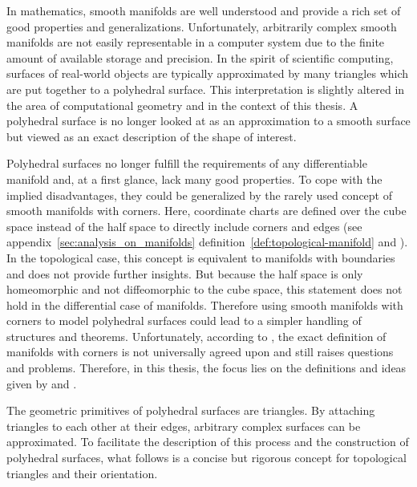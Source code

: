 \documentclass{stdlocal}
\begin{document}
  In mathematics, smooth manifolds are well understood and provide a rich set of good properties and generalizations.
  Unfortunately, arbitrarily complex smooth manifolds are not easily representable in a computer system due to the finite amount of available storage and precision.
  In the spirit of scientific computing, surfaces of real-world objects are typically approximated by many triangles which are put together to a polyhedral surface.
  This interpretation is slightly altered in the area of computational geometry and in the context of this thesis.
  A polyhedral surface is no longer looked at as an approximation to a smooth surface but viewed as an exact description of the shape of interest.
  \autocite{sharp2020}

  Polyhedral surfaces no longer fulfill the requirements of any differentiable manifold and, at a first glance, lack many good properties.
  To cope with the implied disadvantages, they could be generalized by the rarely used concept of smooth manifolds with corners.
  Here, coordinate charts are defined over the cube space instead of the half space to directly include corners and edges (see appendix~\ref{sec:analysis_on_manifolds} definition~\ref{def:topological-manifold} and \textcite{joyce2009}).
  In the topological case, this concept is equivalent to manifolds with boundaries and does not provide further insights.
  But because the half space is only homeomorphic and not diffeomorphic to the cube space, this statement does not hold in the differential case of manifolds.
  Therefore using smooth manifolds with corners to model polyhedral surfaces could lead to a simpler handling of structures and theorems.
  Unfortunately, according to \textcite{joyce2009}, the exact definition of manifolds with corners is not universally agreed upon and still raises questions and problems.
  Therefore, in this thesis, the focus lies on the definitions and ideas given by \textcite{polthier2006} and \textcite{martinez2005}.

  The geometric primitives of polyhedral surfaces are triangles.
  By attaching triangles to each other at their edges, arbitrary complex surfaces can be approximated.
  To facilitate the description of this process and the construction of polyhedral surfaces, what follows is a concise but rigorous concept for topological triangles and their orientation.
\end{document}
